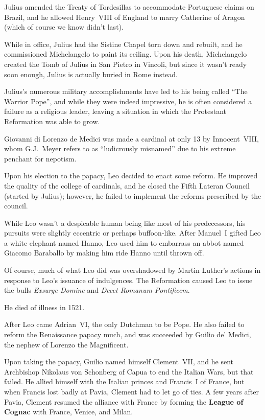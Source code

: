 Julius amended the Treaty of Tordesillas to accommodate Portuguese claims on Brazil,
and he allowed Henry~VIII of England to marry Catherine of Aragon
(which of course we know didn't last).

While in office, Julius had the Sistine Chapel torn down and rebuilt,
and he commissioned Michelangelo to paint its ceiling.
Upon his death, Michelangelo created the Tomb of Julius in San Pietro in Vincoli,
but since it wasn't ready soon enough, Julius is actually buried in Rome instead.

Julius's numerous military accomplishments have led to his being called ``The Warrior Pope'',
and while they were indeed impressive, he is often considered a failure as a religious leader,
leaving a situation in which the Protestant Reformation was able to grow.


Giovanni di Lorenzo de Medici was made a cardinal at only 13 by Innocent~VIII,
whom G.J.\ Meyer refers to as ``ludicrously misnamed'' due to his extreme penchant for nepotism.

Upon his election to the papacy, Leo decided to enact some reform.
He improved the quality of the college of cardinals,
and he closed the Fifth Lateran Council (started by Julius);
however, he failed to implement the reforms prescribed by the council.

While Leo wasn't a despicable human being like most of his predecessors,
his pursuits were slightly eccentric or perhaps buffoon-like.
After Manuel~I gifted Leo a white elephant named Hanno,
Leo used him to embarrass an abbot named Giacomo Baraballo by making him ride Hanno until thrown off.

Of course, much of what Leo did was overshadowed by Martin Luther's actions
in response to Leo's issuance of indulgences.
The Reformation caused Leo to issue
the bulls \textit{Exsurge Domine} and \textit{Decet Romanum Pontificem}.

He died of illness in 1521.


After Leo came Adrian~VI, the only Dutchman to be Pope.
He also failed to reform the Renaissance papacy much,
and was succeeded by Guilio de' Medici,
the nephew of Lorenzo the Magnificent.

Upon taking the papacy, Guilio named himself Clement~VII,
and he sent Archbishop Nikolaus von Schonberg of Capua to end the Italian Wars, but that failed.
He allied himself with the Italian princes and Francis~I of France,
but when Francis lost badly at Pavia, Clement had to let go of ties.
A few years after Pavia, Clement resumed the alliance with France
by forming the \textbf{League of Cognac} with France, Venice, and Milan.

